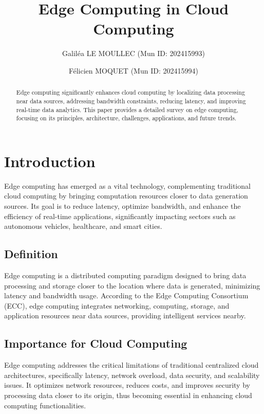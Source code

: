 \documentclass[runningheads]{llncs}
\begin{document}
\title{Edge Computing in Cloud Computing}

\author{Galiléa LE MOULLEC (Mun ID: 202415993) \and Félicien MOQUET (Mun ID: 202415994)}

\maketitle

\begin{abstract}
Edge computing significantly enhances cloud computing by localizing data processing near data sources, addressing bandwidth constraints, reducing latency, and improving real-time data analytics. This paper provides a detailed survey on edge computing, focusing on its principles, architecture, challenges, applications, and future trends.

\end{abstract}

\section{Introduction}
Edge computing has emerged as a vital technology, complementing traditional cloud computing by bringing computation resources closer to data generation sources. Its goal is to reduce latency, optimize bandwidth, and enhance the efficiency of real-time applications, significantly impacting sectors such as autonomous vehicles, healthcare, and smart cities.

\subsection{Definition}
Edge computing is a distributed computing paradigm designed to bring data processing and storage closer to the location where data is generated, minimizing latency and bandwidth usage. According to the Edge Computing Consortium (ECC), edge computing integrates networking, computing, storage, and application resources near data sources, providing intelligent services nearby.

\subsection{Importance for Cloud Computing}
Edge computing addresses the critical limitations of traditional centralized cloud architectures, specifically latency, network overload, data security, and scalability issues. It optimizes network resources, reduces costs, and improves security by processing data closer to its origin, thus becoming essential in enhancing cloud computing functionalities.
\end{document}
